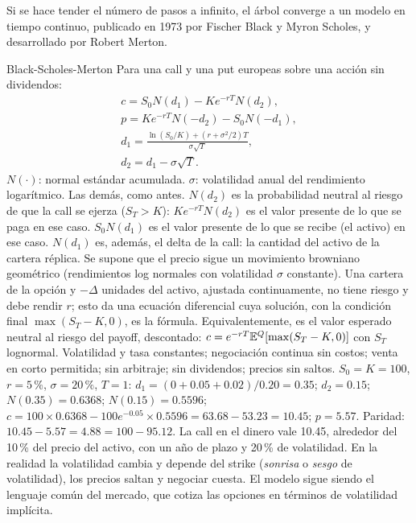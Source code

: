 Si se hace tender el número de pasos a infinito, el árbol converge a un modelo en tiempo continuo, publicado en 1973 por Fischer Black y Myron Scholes, y desarrollado por Robert Merton.

\begin{ficha}{Black-Scholes-Merton}
 Para una call y una put europeas sobre una acción sin dividendos:
\begin{gather*}
c=S_0N(d_1)-Ke^{-rT}N(d_2),\\
p=Ke^{-rT}N(-d_2)-S_0N(-d_1),\\
d_1=\frac{\ln(S_0/K)+(r+\sigma^2/2)T}{\sigma\sqrt T},\\
d_2=d_1-\sigma\sqrt T.
\end{gather*}
 $N(\cdot)$: normal estándar acumulada. $\sigma$: volatilidad anual del rendimiento logarítmico. Las demás, como antes.
 $N(d_2)$ es la probabilidad neutral al riesgo de que la call se ejerza ($S_T>K$): $Ke^{-rT}N(d_2)$ es el valor presente de lo que se paga en ese caso. $S_0N(d_1)$ es el valor presente de lo que se recibe (el activo) en ese caso. $N(d_1)$ es, además, el delta de la call: la cantidad del activo de la cartera réplica.
 Se supone que el precio sigue un movimiento browniano geométrico (rendimientos log normales con volatilidad $\sigma$ constante). Una cartera de la opción y $-\Delta$ unidades del activo, ajustada continuamente, no tiene riesgo y debe rendir $r$; esto da una ecuación diferencial cuya solución, con la condición final $\max(S_T-K,0)$, es la fórmula. Equivalentemente, es el valor esperado neutral al riesgo del payoff, descontado: $c=e^{-rT}\mathbb{E}^Q[\max(S_T-K,0)]$ con $S_T$ lognormal.
 Volatilidad y tasa constantes; negociación continua sin costos; venta en corto permitida; sin arbitraje; sin dividendos; precios sin saltos.
 $S_0=K=100$, $r=5\,\%$, $\sigma=20\,\%$, $T=1$: $d_1=(0+0.05+0.02)/0.20=0.35$; $d_2=0.15$; $N(0.35)=0.6368$; $N(0.15)=0.5596$; $c=100\times0.6368-100e^{-0.05}\times0.5596=63.68-53.23=10.45$; $p=5.57$. Paridad: $10.45-5.57=4.88=100-95.12$.
 La call en el dinero vale 10.45, alrededor del 10\,\% del precio del activo, con un año de plazo y 20\,\% de volatilidad.
 En la realidad la volatilidad cambia y depende del strike (\emph{sonrisa} o \emph{sesgo} de volatilidad), los precios saltan y negociar cuesta. El modelo sigue siendo el lenguaje común del mercado, que cotiza las opciones en términos de volatilidad implícita.
\end{ficha}

